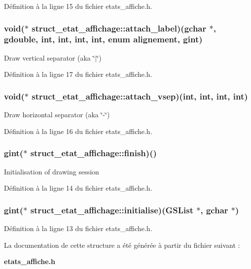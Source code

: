 Définition à la ligne 15 du fichier etats\_\-affiche.h.

\subsubsection[{attach\_\-label}]{\setlength{\rightskip}{0pt plus 5cm}void($\ast$  {\bf struct\_\-etat\_\-affichage::attach\_\-label})(gchar $\ast$, gdouble, int, int, int, int, enum {\bf alignement}, gint)}\label{structstruct__etat__affichage_ac440deecd96da599af43163adc517db4}
Draw vertical separator (aka \char`\"{}$|$\char`\"{}) 

Définition à la ligne 17 du fichier etats\_\-affiche.h.

\subsubsection[{attach\_\-vsep}]{\setlength{\rightskip}{0pt plus 5cm}void($\ast$  {\bf struct\_\-etat\_\-affichage::attach\_\-vsep})(int, int, int, int)}\label{structstruct__etat__affichage_a6edee153a79b2cd856a60915b3c7a90d}
Draw horizontal separator (aka \char`\"{}-\/\char`\"{}) 

Définition à la ligne 16 du fichier etats\_\-affiche.h.

\subsubsection[{finish}]{\setlength{\rightskip}{0pt plus 5cm}gint($\ast$  {\bf struct\_\-etat\_\-affichage::finish})()}\label{structstruct__etat__affichage_ae36a437471fa42220aff0e21e285a685}
Initialisation of drawing session 

Définition à la ligne 14 du fichier etats\_\-affiche.h.

\subsubsection[{initialise}]{\setlength{\rightskip}{0pt plus 5cm}gint($\ast$  {\bf struct\_\-etat\_\-affichage::initialise})(GSList $\ast$, gchar $\ast$)}\label{structstruct__etat__affichage_a09dfdd198837606c65f92b43a4bd61f6}


Définition à la ligne 13 du fichier etats\_\-affiche.h.



La documentation de cette structure a été générée à partir du fichier suivant :\begin{DoxyCompactItemize}
\item 
{\bf etats\_\-affiche.h}\end{DoxyCompactItemize}
